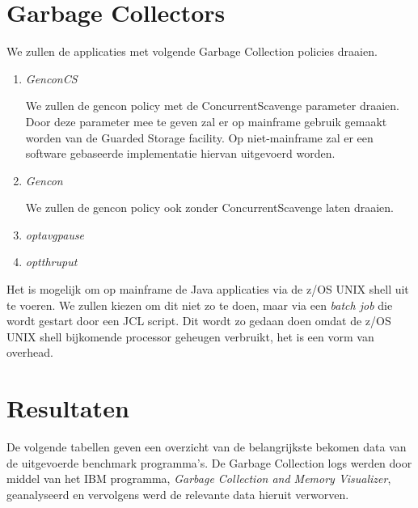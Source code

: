 \section{Garbage Collectors}
We zullen de applicaties met volgende Garbage Collection policies draaien.

\begin{enumerate}
    
    \item \textit{GenconCS}
    
    We zullen de gencon policy met de ConcurrentScavenge parameter draaien.
    Door deze parameter mee te geven zal er op mainframe gebruik gemaakt worden van de Guarded Storage facility.
    Op niet-mainframe zal er een software gebaseerde implementatie hiervan uitgevoerd worden.
    
    \item \textit{Gencon}
    
    We zullen de gencon policy ook zonder ConcurrentScavenge laten draaien.
    
    \item \textit{optavgpause}
    
    \item \textit{optthruput}
    
    
    
\end{enumerate}


Het is mogelijk om op mainframe de Java applicaties via de z/OS UNIX shell uit te voeren.
We zullen kiezen om dit niet zo te doen, maar via een \textit{batch job} die wordt gestart door een JCL script. 
Dit wordt zo gedaan doen omdat de z/OS UNIX shell bijkomende processor geheugen verbruikt, het is een vorm van overhead.

\section{Resultaten}

De  volgende tabellen geven een overzicht van de belangrijkste bekomen data van de uitgevoerde benchmark programma's.
De Garbage Collection logs werden door middel van het IBM programma, \textit{Garbage Collection and Memory Visualizer}, geanalyseerd en vervolgens werd de relevante data hieruit verworven.


